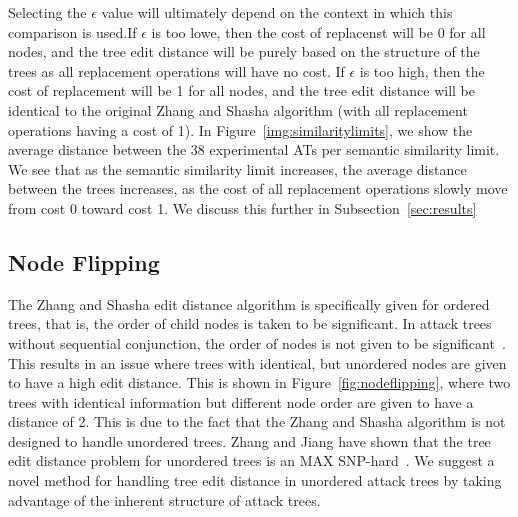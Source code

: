 Selecting the $\epsilon$ value will ultimately depend on the context in which this comparison is used.If $\epsilon$ is too lowe, then the cost of replacenst will be 0 for all nodes, and the tree edit distance will be purely based on the structure of the trees as all replacement operations will have no cost. If $\epsilon$ is too high, then the cost of replacement will be 1 for all nodes, and the tree edit distance will be identical to the original Zhang and Shasha algorithm (with all replacement operations having a cost of 1). In Figure~\ref{img:similaritylimits}, we show the average distance between the 38 experimental ATs per semantic similarity limit. We see that as the semantic similarity limit increases, the average distance between the trees increases, as the cost of all replacement operations slowly move from cost 0 toward cost 1. We discuss this further in Subsection~\ref{sec:results}

\subsection{Node Flipping}

The Zhang and Shasha edit distance algorithm is specifically given for ordered trees, that is, the order of child nodes is taken to be significant. In attack trees without sequential conjunction, the order of nodes is not given to be significant~\cite{mauw_foundations_2006,jhawar_attack_2015}. This results in an issue where trees with identical, but unordered nodes are given to have a high edit distance. This is shown in Figure~\ref{fig:nodeflipping}, where two trees with identical information but different node order are given to have a distance of 2. This is due to the fact that the Zhang and Shasha algorithm is not designed to handle unordered trees. Zhang and Jiang have shown that the tree edit distance problem for unordered trees is an MAX SNP-hard~\cite{zhangMAXSNPhardResults1994}. We suggest a novel method for handling tree edit distance in unordered attack trees by taking advantage of the inherent structure of attack trees.


